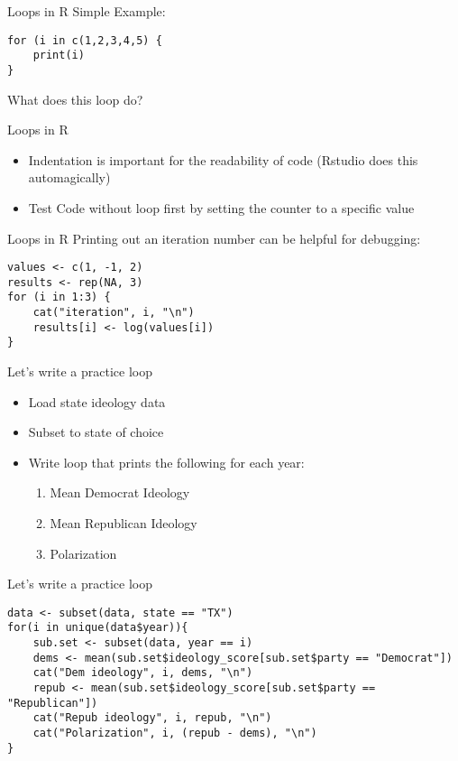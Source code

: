 \documentclass[presentation]{beamer}
\begin{document}
\begin{frame}[fragile,label={sec:orgffd81a9}]{Loops in R}
 Simple Example:

\begin{verbatim}
for (i in c(1,2,3,4,5) {
    print(i)
}
\end{verbatim}

What does this loop do?
\end{frame}

\begin{frame}[label={sec:org5ce11ec}]{Loops in R}
\begin{itemize}
\item Indentation is important for the readability of code (Rstudio does this automagically)
\item Test  Code without loop first by setting the counter to a specific value
\end{itemize}
\end{frame}



\begin{frame}[fragile,label={sec:org1e666fa}]{Loops in R}
 Printing out an iteration number can be helpful for debugging:

\begin{verbatim}
values <- c(1, -1, 2)
results <- rep(NA, 3)
for (i in 1:3) {
    cat("iteration", i, "\n")
    results[i] <- log(values[i])
}
\end{verbatim}
\end{frame}


\begin{frame}[label={sec:org45047f3}]{Let's write a practice loop}
\begin{itemize}
\item Load state ideology data
\item Subset to state of choice
\item Write loop that prints the following for each year:
\begin{enumerate}
\item Mean Democrat Ideology
\item Mean Republican Ideology
\item Polarization
\end{enumerate}
\end{itemize}
\end{frame}

\begin{frame}[fragile,shrink=25,label={sec:org9206be7}]{Let's write a practice loop}
 \begin{verbatim}
data <- subset(data, state == "TX")
for(i in unique(data$year)){
    sub.set <- subset(data, year == i)
    dems <- mean(sub.set$ideology_score[sub.set$party == "Democrat"])
    cat("Dem ideology", i, dems, "\n")
    repub <- mean(sub.set$ideology_score[sub.set$party == "Republican"])
    cat("Repub ideology", i, repub, "\n")
    cat("Polarization", i, (repub - dems), "\n")
}
\end{verbatim}
\end{frame}
\end{document}
